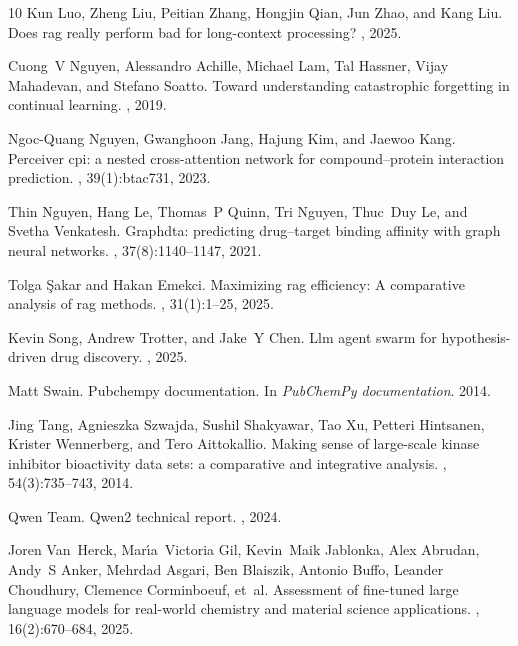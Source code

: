 \documentclass[letterpaper,twocolumn,10pt]{llncs}
\begin{document}
\begin{thebibliography}{10}
Kun Luo, Zheng Liu, Peitian Zhang, Hongjin Qian, Jun Zhao, and Kang Liu.
\newblock Does rag really perform bad for long-context processing?
, 2025.

Cuong~V Nguyen, Alessandro Achille, Michael Lam, Tal Hassner, Vijay Mahadevan, and Stefano Soatto.
\newblock Toward understanding catastrophic forgetting in continual learning.
, 2019.

Ngoc-Quang Nguyen, Gwanghoon Jang, Hajung Kim, and Jaewoo Kang.
\newblock Perceiver cpi: a nested cross-attention network for compound--protein interaction prediction.
, 39(1):btac731, 2023.

Thin Nguyen, Hang Le, Thomas~P Quinn, Tri Nguyen, Thuc~Duy Le, and Svetha Venkatesh.
\newblock Graphdta: predicting drug--target binding affinity with graph neural networks.
, 37(8):1140--1147, 2021.

Tolga {\c{S}}akar and Hakan Emekci.
\newblock Maximizing rag efficiency: A comparative analysis of rag methods.
, 31(1):1--25, 2025.

Kevin Song, Andrew Trotter, and Jake~Y Chen.
\newblock Llm agent swarm for hypothesis-driven drug discovery.
, 2025.

Matt Swain.
\newblock Pubchempy documentation.
\newblock In {\em PubChemPy documentation}. 2014.

Jing Tang, Agnieszka Szwajda, Sushil Shakyawar, Tao Xu, Petteri Hintsanen, Krister Wennerberg, and Tero Aittokallio.
\newblock Making sense of large-scale kinase inhibitor bioactivity data sets: a comparative and integrative analysis.
, 54(3):735--743, 2014.

Qwen Team.
\newblock Qwen2 technical report.
, 2024.

Joren Van~Herck, Mar{\'\i}a~Victoria Gil, Kevin~Maik Jablonka, Alex Abrudan, Andy~S Anker, Mehrdad Asgari, Ben Blaiszik, Antonio Buffo, Leander Choudhury, Clemence Corminboeuf, et~al.
\newblock Assessment of fine-tuned large language models for real-world chemistry and material science applications.
, 16(2):670--684, 2025.


\end{thebibliography}
\end{document}
